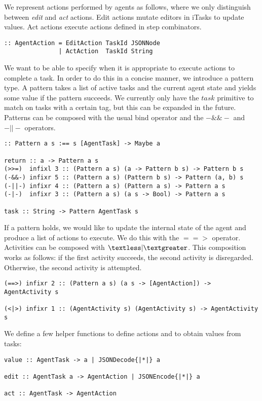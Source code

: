 \documentclass[english]{article}
\begin{document}
We represent actions performed by agents as follows, where we only distinguish between \textit{edit} and \textit{act} actions. Edit actions mutate editors in iTasks to update values. Act actions execute actions defined in step combinators.

\begin{lstlisting}
:: AgentAction = EditAction TaskId JSONNode
               | ActAction  TaskId String
\end{lstlisting}

We want to be able to specify when it is appropriate to execute actions to complete a task. In order to do this in a concise manner, we introduce a pattern type. A pattern takes a list of active tasks and the current agent state and yields some value if the pattern succeeds. We currently only have the $task$ primitive to match on tasks with a certain tag, but this can be expanded in the future. Patterns can be composed with the usual bind operator and the $-\&\&-$ and $-||-$ operators. 

\begin{lstlisting}
:: Pattern a s :== s [AgentTask] -> Maybe a

return :: a -> Pattern a s
(>>=)  infixl 3 :: (Pattern a s) (a -> Pattern b s) -> Pattern b s
(-&&-) infixr 5 :: (Pattern a s) (Pattern b s) -> Pattern (a, b) s
(-||-) infixr 4 :: (Pattern a s) (Pattern a s) -> Pattern a s
(-|-)  infixr 3 :: (Pattern a s) (a s -> Bool) -> Pattern a s

task :: String -> Pattern AgentTask s
\end{lstlisting}

If a pattern holds, we would like to update the internal state of the agent and produce a list of actions to execute. We do this with the $==>$ operator. Activities can be composed with $\textless |\textgreater$. This composition works as follows: if the first activity succeeds, the second activity is disregarded. Otherwise, the second activity is attempted.

\begin{lstlisting}
(==>) infixr 2 :: (Pattern a s) (a s -> [AgentAction]) -> AgentActivity s

(<|>) infixr 1 :: (AgentActivity s) (AgentActivity s) -> AgentActivity s
\end{lstlisting} 

We define a few helper functions to define actions and to obtain values from tasks:

\begin{lstlisting}
value :: AgentTask -> a | JSONDecode{|*|} a

edit :: AgentTask a -> AgentAction | JSONEncode{|*|} a

act :: AgentTask -> AgentAction
\end{lstlisting}
\end{document}
